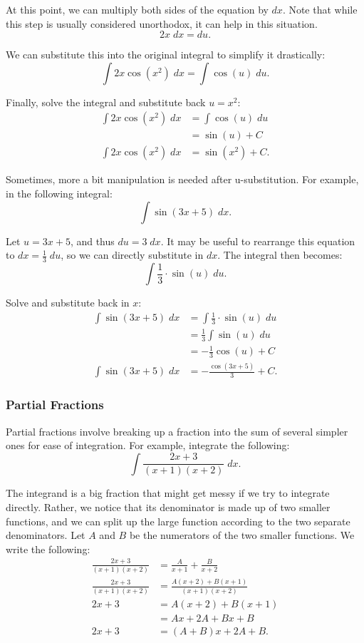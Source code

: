 \documentclass[12pt]{article}
\begin{document}
At this point, we can multiply both sides of the equation by $dx$. Note that while this step is usually considered unorthodox, it can help in this situation.
\[ 2x \; dx = du. \]

\noindent We can substitute this into the original integral to simplify it drastically:
\[ \int 2x \cos(x^2) \; dx = \int \cos(u) \; du. \]

\noindent Finally, solve the integral and substitute back $u = x^2$:
\begin{align*}
	\int 2x \cos(x^2) \; dx &= \int \cos(u) \; du \\[5pt]
	&= \sin(u) + C \\[5pt]
	\int 2x \cos(x^2) \; dx &= \sin(x^2) + C.
\end{align*}

Sometimes, more a bit manipulation is needed after u-substitution. For example, in the following integral:
\[ \int \sin(3x + 5) \; dx. \]

\noindent Let $u = 3x + 5$, and thus $du = 3 \; dx$. It may be useful to rearrange this equation to $dx = \frac{1}{3} \; du$, so we can directly substitute in $dx$. The integral then becomes:
\[ \int \frac{1}{3} \cdot \sin(u) \; du. \]

\noindent Solve and substitute back in $x$:
\begin{align*}
	\int \sin(3x + 5) \; dx &= \int \frac{1}{3} \cdot \sin(u) \; du \\[5pt]
	&= \frac{1}{3} \int \sin(u) \; du \\[5pt]
	&= -\frac{1}{3} \cos(u) + C \\[5pt]
	\int \sin(3x + 5) \; dx &= -\frac{\cos(3x + 5)}{3} + C.
\end{align*}

\subsubsection{Partial Fractions}
Partial fractions involve breaking up a fraction into the sum of several simpler ones for ease of integration. For example, integrate the following:
\[ \int \frac{2x + 3}{(x + 1)(x + 2)} \; dx. \]

The integrand is a big fraction that might get messy if we try to integrate directly. Rather, we notice that its denominator is made up of two smaller functions, and we can split up the large function according to the two separate denominators. Let $A$ and $B$ be the numerators of the two smaller functions. We write the following:
\begin{align*}
	\frac{2x + 3}{(x + 1)(x + 2)} &= \frac{A}{x + 1} + \frac{B}{x + 2} \\[5pt]
	\frac{2x + 3}{(x + 1)(x + 2)} &= \frac{A(x + 2) + B(x + 1)}{(x + 1)(x + 2)} \\[5pt]
	2x + 3 &= A(x + 2) + B(x + 1) \\
	&= Ax + 2A + Bx + B \\
	2x + 3 &= (A + B)x + 2A + B.
\end{align*}
\end{document}
